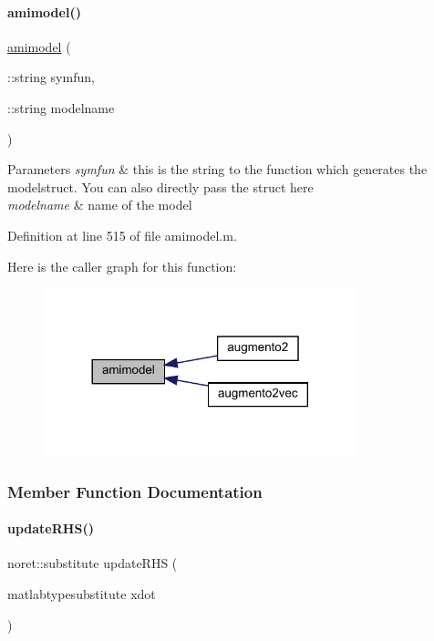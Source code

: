 \paragraph{\texorpdfstring{amimodel()}{amimodel()}}
{\footnotesize\ttfamily \mbox{\hyperlink{classamimodel}{amimodel}} (\begin{DoxyParamCaption}\item[{\+::string}]{symfun,  }\item[{\+::string}]{modelname }\end{DoxyParamCaption})}


\begin{DoxyParams}{Parameters}
{\em symfun} & this is the string to the function which generates the modelstruct. You can also directly pass the struct here \\
\hline
{\em modelname} & name of the model \\
\hline
\end{DoxyParams}


Definition at line 515 of file amimodel.\+m.

Here is the caller graph for this function\+:
\nopagebreak
\begin{figure}[H]
\begin{center}
\leavevmode
\includegraphics[width=257pt]{classamimodel_a05d52506788717b3d482845748446a60_icgraph}
\end{center}
\end{figure}


\subsubsection{Member Function Documentation}
\mbox{\label{classamimodel_aa508c0cd4ac026e464f85cec25678850}} 
\paragraph{\texorpdfstring{update\+R\+H\+S()}{updateRHS()}}
{\footnotesize\ttfamily noret\+::substitute update\+R\+HS (\begin{DoxyParamCaption}\item[{matlabtypesubstitute}]{xdot }\end{DoxyParamCaption})}


